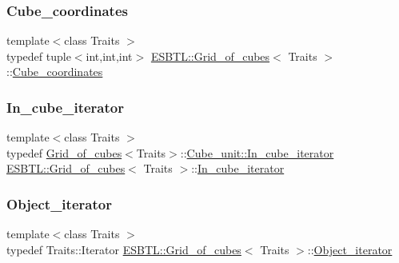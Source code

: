 \subsubsection{\texorpdfstring{Cube\+\_\+coordinates}{Cube\_coordinates}}
{\footnotesize\ttfamily template$<$class Traits $>$ \\
typedef tuple$<$int,int,int$>$ \hyperlink{structESBTL_1_1Grid__of__cubes}{E\+S\+B\+T\+L\+::\+Grid\+\_\+of\+\_\+cubes}$<$ Traits $>$\+::\hyperlink{structESBTL_1_1Grid__of__cubes_ad55c84346bab961e08d95e494551d07d}{Cube\+\_\+coordinates}}

\mbox{\label{structESBTL_1_1Grid__of__cubes_a1586dac85e561a73b591da3cf07a47b1}} 
\subsubsection{\texorpdfstring{In\+\_\+cube\+\_\+iterator}{In\_cube\_iterator}}
{\footnotesize\ttfamily template$<$class Traits $>$ \\
typedef \hyperlink{structESBTL_1_1Grid__of__cubes}{Grid\+\_\+of\+\_\+cubes}$<$Traits$>$\+::\hyperlink{structESBTL_1_1Grid__of__cubes_1_1Cube__unit_a9a5e21b8376bdeb122987e83f89b3c06}{Cube\+\_\+unit\+::\+In\+\_\+cube\+\_\+iterator} \hyperlink{structESBTL_1_1Grid__of__cubes}{E\+S\+B\+T\+L\+::\+Grid\+\_\+of\+\_\+cubes}$<$ Traits $>$\+::\hyperlink{structESBTL_1_1Grid__of__cubes_a1586dac85e561a73b591da3cf07a47b1}{In\+\_\+cube\+\_\+iterator}}

\mbox{\label{structESBTL_1_1Grid__of__cubes_ae77665f05d6c7ae05c3d2d764df99193}} 
\subsubsection{\texorpdfstring{Object\+\_\+iterator}{Object\_iterator}}
{\footnotesize\ttfamily template$<$class Traits $>$ \\
typedef Traits\+::\+Iterator \hyperlink{structESBTL_1_1Grid__of__cubes}{E\+S\+B\+T\+L\+::\+Grid\+\_\+of\+\_\+cubes}$<$ Traits $>$\+::\hyperlink{structESBTL_1_1Grid__of__cubes_ae77665f05d6c7ae05c3d2d764df99193}{Object\+\_\+iterator}}



